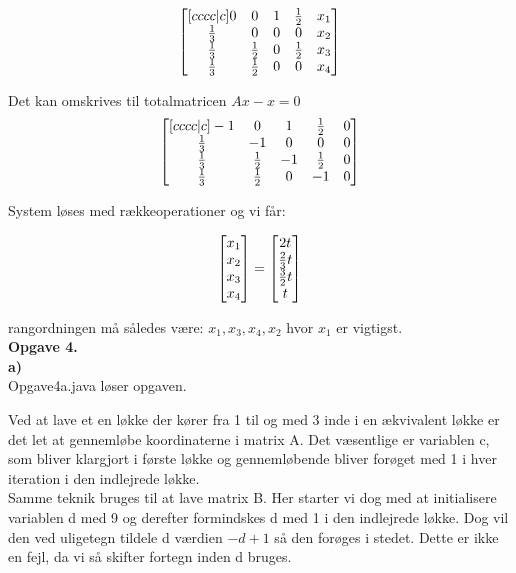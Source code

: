 \documentclass[12pt]{article}
\begin{document}
{$$
\begin{bmatrix}[cccc|c]
0 & 0 & 1 & 1 \over 2 & x_1\\
1 \over 3 & 0 & 0 & 0 & x_2 \\
1 \over 3 & 1 \over 2 & 0 & 1 \over 2 & x_3 \\
1 \over 3 & 1 \over 2 & 0 & 0 & x_4
\end{bmatrix}
$$

Det kan omskrives til totalmatricen $Ax -x = 0$
$$
\begin{bmatrix}[cccc|c]
-1 & 0 & 1 & 1 \over 2 & 0\\
1 \over 3 & -1 & 0 & 0 & 0 \\
1 \over 3 & 1 \over 2 & -1 & 1 \over 2 & 0 \\
1 \over 3 & 1 \over 2 & 0 & -1 & 0
\end{bmatrix}
$$

System løses med rækkeoperationer og vi får:

$$
\begin{bmatrix}
x_1 \\
x_2\\
x_3\\
x_4
\end{bmatrix}
=
\begin{bmatrix}
2t \\
{2 \over 3} t\\
{3 \over 2} t\\
t
\end{bmatrix}$$

rangordningen må således være: $x_1, x_3, x_4, x_2$ hvor $x_1$ er vigtigst.\\

\textbf{\large Opgave 4.}\\

\textbf{a)}\\

Opgave4a.java løser opgaven.

Ved at lave et en løkke der kører fra 1 til og med 3 inde i en ækvivalent løkke er det let
at gennemløbe koordinaterne i matrix A. Det væsentlige er variablen c, som bliver klargjort i 
første løkke og gennemløbende bliver forøget med 1 i hver iteration i den indlejrede løkke.\\

Samme teknik bruges til at lave matrix B. Her starter vi dog med at initialisere variablen d med 9
og derefter formindskes d med 1 i den indlejrede løkke. Dog vil den ved uligetegn tildele d værdien 
$-d + 1$ så den forøges i stedet. Dette er ikke en fejl, da vi så skifter fortegn inden d bruges.

}
\end{document}
